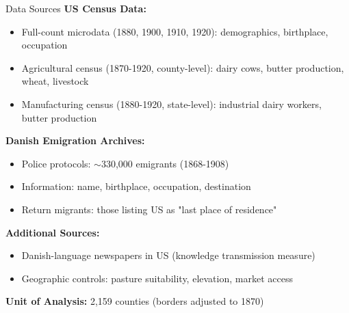 \documentclass{beamer}
\begin{document}
\begin{frame}{Data Sources}
\textbf{US Census Data:}
\begin{itemize}
    \item Full-count microdata (1880, 1900, 1910, 1920): demographics, birthplace, occupation
    \item Agricultural census (1870-1920, county-level): dairy cows, butter production, wheat, livestock
    \item Manufacturing census (1880-1920, state-level): industrial dairy workers, butter production
\end{itemize}

\vspace{0.3cm}
\textbf{Danish Emigration Archives:}
\begin{itemize}
    \item Police protocols: $\sim$330,000 emigrants (1868-1908)
    \item Information: name, birthplace, occupation, destination
    \item Return migrants: those listing US as "last place of residence"
\end{itemize}

\vspace{0.3cm}
\textbf{Additional Sources:}
\begin{itemize}
    \item Danish-language newspapers in US (knowledge transmission measure)
    \item Geographic controls: pasture suitability, elevation, market access
\end{itemize}

\vspace{0.2cm}
\textbf{Unit of Analysis:} 2,159 counties (borders adjusted to 1870)
\end{frame}
\end{document}
